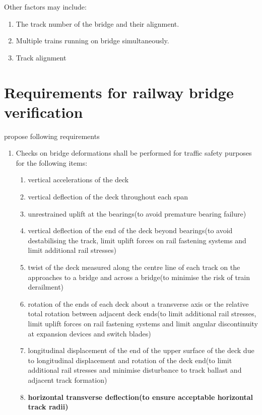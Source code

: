 Other factors may include:

\begin{enumerate}

	\item The track number of the bridge and their alignment. 
	\item Multiple trains running on bridge simultaneously. 
	\item Track alignment

\end{enumerate}

\section{Requirements for railway bridge verification}
\cite{EC0} propose following requirements


\begin{enumerate}
	\item Checks on bridge deformations shall be performed for traffic safety purposes for the following items:
	\begin{enumerate}[-]
		\item vertical accelerations of the deck
		\item vertical deflection of the deck throughout each span
		\item unrestrained uplift at the bearings(to avoid premature bearing failure)
		\item vertical deflection of the end of the deck beyond bearings(to avoid destabilising the track, limit uplift forces on rail fastening systems and limit additional rail stresses) 
		\item twist of the deck measured along the centre line of each track on the approaches to a bridge and across a bridge(to minimise the risk of train derailment)
		\item rotation of the ends of each deck about a transverse axis or the relative total rotation between adjacent deck ends(to limit additional rail stresses, limit uplift forces on rail fastening systems and limit angular discontinuity at expansion devices and switch blades)
		\item longitudinal displacement of the end of the upper surface of the deck due to longitudinal displacement and rotation of the deck end(to limit additional rail stresses and minimise disturbance to track ballast and adjacent track formation)
		\item \textbf{horizontal transverse deflection(to ensure acceptable horizontal track radii)}

\end{enumerate}
\end{enumerate}

